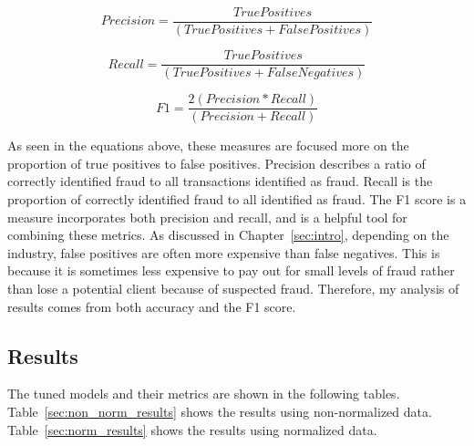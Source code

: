 \documentclass[midd]{thesis}
\begin{document}
\begin{equation}
\label{eq:precision}
    Precision = \frac{True Positives} {(True Positives + False Positives)}
\end{equation}

\begin{equation}
\label{eq:recall}
    Recall = \frac{True Positives}{ (True Positives + False Negatives)}
\end{equation}

\begin{equation}
\label{eq:F1}
    F1 = \frac{2 (Precision * Recall)} {(Precision + Recall)}
\end{equation}


As seen in the equations above, these measures are focused more on the proportion of true positives to false positives. Precision describes a ratio of correctly identified fraud to all transactions identified as fraud. Recall is the proportion of correctly identified fraud to all identified as fraud. The F1 score is a measure incorporates both precision and recall, and is a helpful tool for combining these metrics. As discussed in Chapter~\ref{sec:intro}, depending on the industry, false positives are often more expensive than false negatives. This is because it is sometimes less expensive to pay out for small levels of fraud rather than lose a potential client because of suspected fraud. Therefore, my analysis of results comes from both accuracy and the F1 score.



\subsection{Results}

The tuned models and their metrics are shown in the following tables. Table~\ref{sec:non_norm_results} shows the results using non-normalized data. Table~\ref{sec:norm_results} shows the results using normalized data. 
\end{document}
